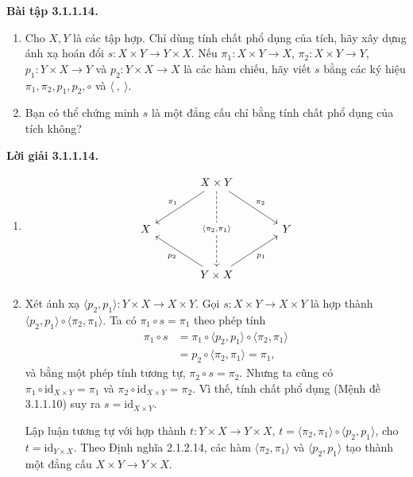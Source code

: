 \noindent\textbf{Bài tập 3.1.1.14.}\keepwithnext
\begin{enumerate}[label=\alph*.]
\item Cho $X,Y$ là các tập hợp. Chỉ dùng tính chất phổ dụng của tích, hãy xây dựng ánh xạ hoán đổi $s:X\times Y\to Y\times X$. Nếu $\pi_1:X\times Y\to X$, $\pi_2:X\times Y\to Y$, $p_1:Y\times X\to Y$ và $p_2:Y\times X\to X$ là các hàm chiếu, hãy viết $s$ bằng các ký hiệu $\pi_1,\pi_2,p_1,p_2,\circ$ và $\langle\ ,\ \rangle$.
\item Bạn có thể chứng minh $s$ là một đẳng cấu chỉ bằng tính chất phổ dụng của tích không?
\end{enumerate}
\noindent\textbf{Lời giải 3.1.1.14.}\keepwithnext
\begin{enumerate}[label=\alph*.]
\item %
\[\begin{tikzcd}[column sep=large,row sep=large]
&X\times Y\arrow[dl,"\pi_1"']\arrow[dr,"\pi_2"]\arrow[dd,dashed,"{\langle\pi_2,\pi_1\rangle}" description]&\\
X&&Y\\
&Y\times X\arrow[ul,"p_2"]\arrow[ur,"p_1"']&
\end{tikzcd}\]
\item Xét ánh xạ $\langle p_2,p_1\rangle:Y\times X\to X\times Y$. Gọi $s:X\times Y\to X\times Y$ là hợp thành $\langle p_2,p_1\rangle\circ\langle\pi_2,\pi_1\rangle$. Ta có $\pi_1\circ s=\pi_1$ theo phép tính
\begin{align*}
\pi_1\circ s&=\pi_1\circ\langle p_2,p_1\rangle\circ\langle\pi_2,\pi_1\rangle\\
&=p_2\circ\langle\pi_2,\pi_1\rangle=\pi_1,
\end{align*}
và bằng một phép tính tương tự, $\pi_2\circ s=\pi_2$. Nhưng ta cũng có $\pi_1\circ\mathrm{id}_{X\times Y}=\pi_1$ và $\pi_2\circ\mathrm{id}_{X\times Y}=\pi_2$. Vì thế, tính chất phổ dụng (Mệnh đề 3.1.1.10) suy ra $s=\mathrm{id}_{X\times Y}$.

Lập luận tương tự với hợp thành $t:Y\times X\to Y\times X$, $t=\langle\pi_2,\pi_1\rangle\circ\langle p_2,p_1\rangle$, cho $t=\mathrm{id}_{Y\times X}$. Theo Định nghĩa 2.1.2.14, các hàm $\langle\pi_2,\pi_1\rangle$ và $\langle p_2,p_1\rangle$ tạo thành một đẳng cấu $X\times Y\to Y\times X$.
\end{enumerate}

